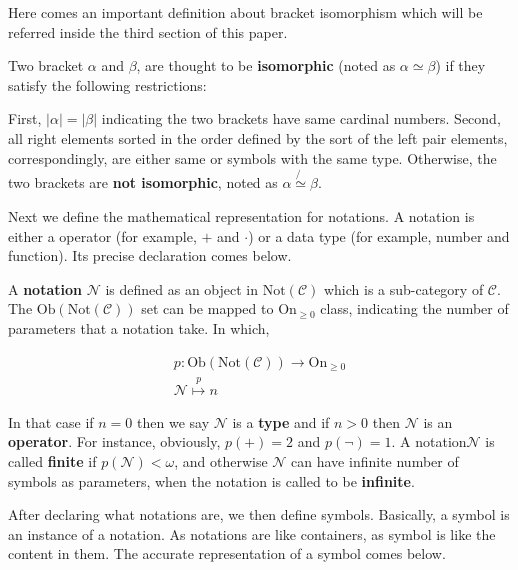\documentclass[preprint]{elsarticle}
\numberwithin{theorem}{section}	%
\numberwithin{axiom}{section}	%
\numberwithin{definition}{section}	%
\begin{document}
Here comes an important definition about bracket isomorphism which will be referred inside the third section of this paper.

\begin{definition}
	Two bracket \(\alpha\) and \(\beta\), are thought to be \textbf{ isomorphic} (noted as \(\alpha \simeq \beta\)) if they satisfy the following restrictions:
	
	First, \(|\alpha |=|\beta |\) indicating the two brackets have same cardinal numbers. Second, all right elements sorted in the order defined by the sort of the left pair elements, correspondingly, are either same or symbols with the same type. Otherwise, the two brackets are \textbf{ not isomorphic}, noted as \(\alpha \not{\simeq}\beta\).
\end{definition}

Next we define the mathematical representation for notations. A notation is either a operator (for example, \(+\) and \(\cdot\)) or a data type (for example, number and function). Its precise declaration comes below.

\begin{definition}
	A \textbf{ notation} \(\mathcal{N}\) is defined as an object in \(\text{Not}(\mathcal{C})\) which is a sub-category of \(\mathcal{C}\). The \(\text{Ob}(\text{Not}(\mathcal{C}))\) set can be mapped to \(\text{On}_{\geq 0}\) class, indicating the number of parameters that a notation take. In which,
	
	\begin{equation}
		\begin{gathered}
			\mathit{p}:\text{Ob}(\text{Not}(\mathcal{C}))\to \text{On}_{\geq 0}\\
			\mathcal{N}\overset{\mathit{p}}{\mapsto}n
		\end{gathered}
	\end{equation}
	
	In that case if \(n=0\) then we say \(\mathcal{N}\) is a \textbf{ type} and if \(n>0\) then \(\mathcal{N}\) is an \textbf{ operator}. For instance, obviously, \(\mathit{p}(+)=2\) and \(\mathit{p}(\neg )=1\). A notation\(\mathcal{N}\) is called \textbf{ finite} if \(\mathit{p}(\mathcal{N})<\omega\), and otherwise \(\mathcal{N}\) can have infinite number of symbols as parameters, when the notation is called to be \textbf{ infinite}.
\end{definition}

After declaring what notations are, we then define symbols. Basically, a symbol is an instance of a notation. As notations are like containers, as symbol is like the content in them. The accurate representation of a symbol comes below.
\end{document}

